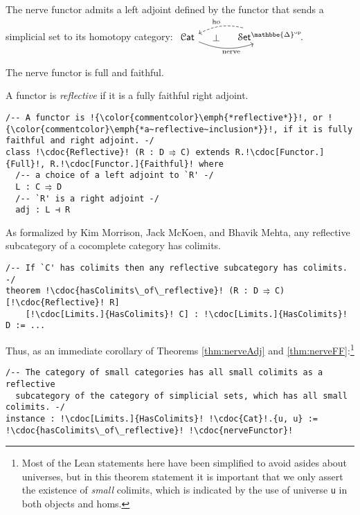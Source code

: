 \documentclass[a4paper,UKenglish,cleveref, autoref, thm-restate]{lipics-v2021}
\newcommand{\op}{\textup{op}}
\newcommand{\ho}{\textup{ho}}
\newcommand{\nerve}{\textup{nerve}}
\newcommand{\cat}[1]{\textup{\textsf{#1}}}%
\newcommand{\1}{\mathbbe{1}}
\newcommand{\2}{\mathbbe{2}}
\newcommand{\3}{\mathbbe{3}}
\newcommand{\DDelta}{\mathbbe{\Delta}}
\newcommand{\Cat}{\mathcal{C}\cat{at}}
\newcommand{\Set}{\mathcal{S}\cat{et}}
\newcommand{\cdoc}[2][]{\href{https://leanprover-community.github.io/mathlib4_docs/find/?pattern=CategoryTheory.#1#2\#doc}{\texttt{#2}}}
\begin{document}
\begin{theorem}[\cdoc{nerveAdjunction}]\label{thm:nerveAdj} The nerve functor admits a left adjoint defined by the functor that sends a simplicial set to its homotopy category:
$ \begin{tikzcd}[column sep=large] \Cat \arrow[r, bend right=20, "{\nerve}"' pos=.6] \arrow[r, phantom, "\bot"] & \Set^{\DDelta^\op}\!. \arrow[l, bend right=20, dashed, "{\ho}"' pos=.45]
\end{tikzcd}$
\end{theorem}

\begin{theorem}[\cdoc{nerveFunctor.fullyfaithful}]\label{thm:nerveFF} The nerve functor is full and faithful.
\end{theorem}

A functor is \emph{reflective} if it is a fully faithful right adjoint.
\begin{lstlisting}
/-- A functor is !{\color{commentcolor}\emph{*reflective*}}!, or !{\color{commentcolor}\emph{*a~reflective~inclusion*}}!, if it is fully faithful and right adjoint. -/
class !\cdoc{Reflective}! (R : D ⥤ C) extends R.!\cdoc[Functor.]{Full}!, R.!\cdoc[Functor.]{Faithful}! where
  /-- a choice of a left adjoint to `R' -/
  L : C ⥤ D
  /-- `R' is a right adjoint -/
  adj : L ⊣ R
\end{lstlisting}
As formalized by Kim Morrison, Jack McKoen, and Bhavik Mehta, any reflective subcategory of a cocomplete category has colimits.

\begin{lstlisting}
/-- If `C' has colimits then any reflective subcategory has colimits. -/
theorem !\cdoc{hasColimits\_of\_reflective}! (R : D ⥤ C) [!\cdoc{Reflective}! R]
    [!\cdoc[Limits.]{HasColimits}! C] : !\cdoc[Limits.]{HasColimits}! D := ...
\end{lstlisting}

Thus, as an immediate corollary of Theorems \ref{thm:nerveAdj} and \ref{thm:nerveFF}:\footnote{Most of the Lean statements here have been simplified to avoid asides about universes, but in this theorem statement it is important that we only assert the existence of \emph{small} colimits, which is indicated by the use of universe \lstinline|u| in both objects and homs.}
\begin{lstlisting}
/-- The category of small categories has all small colimits as a reflective
  subcategory of the category of simplicial sets, which has all small colimits. -/
instance : !\cdoc[Limits.]{HasColimits}! !\cdoc{Cat}!.{u, u} := !\cdoc{hasColimits\_of\_reflective}! !\cdoc{nerveFunctor}!
\end{lstlisting}
\end{document}
